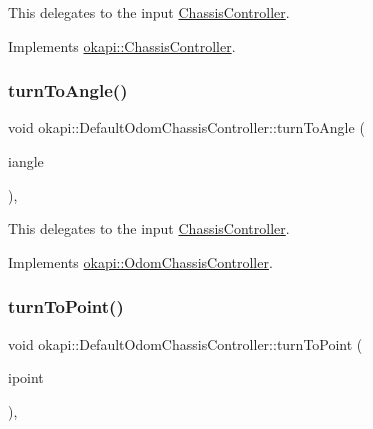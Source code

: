 This delegates to the input \mbox{\hyperlink{classokapi_1_1ChassisController}{Chassis\+Controller}}. 

Implements \mbox{\hyperlink{classokapi_1_1ChassisController_a35cadd99478629637b4bd3a5e709871a}{okapi\+::\+Chassis\+Controller}}.

\mbox{\label{classokapi_1_1DefaultOdomChassisController_aaf6e4d74384b87510d35b639e45f9dc2}} 
\subsubsection{\texorpdfstring{turnToAngle()}{turnToAngle()}}
{\footnotesize\ttfamily void okapi\+::\+Default\+Odom\+Chassis\+Controller\+::turn\+To\+Angle (\begin{DoxyParamCaption}\item[{const Q\+Angle \&}]{iangle }\end{DoxyParamCaption})\hspace{0.3cm}{\ttfamily [override]}, {\ttfamily [virtual]}}

This delegates to the input \mbox{\hyperlink{classokapi_1_1ChassisController}{Chassis\+Controller}}. 

Implements \mbox{\hyperlink{classokapi_1_1OdomChassisController_ac90298bb9081d95c52800dbf679dd658}{okapi\+::\+Odom\+Chassis\+Controller}}.

\mbox{\label{classokapi_1_1DefaultOdomChassisController_a6692219d4f4c264346c5c8096be41610}} 
\subsubsection{\texorpdfstring{turnToPoint()}{turnToPoint()}}
{\footnotesize\ttfamily void okapi\+::\+Default\+Odom\+Chassis\+Controller\+::turn\+To\+Point (\begin{DoxyParamCaption}\item[{const \mbox{\hyperlink{structokapi_1_1Point}{Point}} \&}]{ipoint }\end{DoxyParamCaption})\hspace{0.3cm}{\ttfamily [override]}, {\ttfamily [virtual]}}

